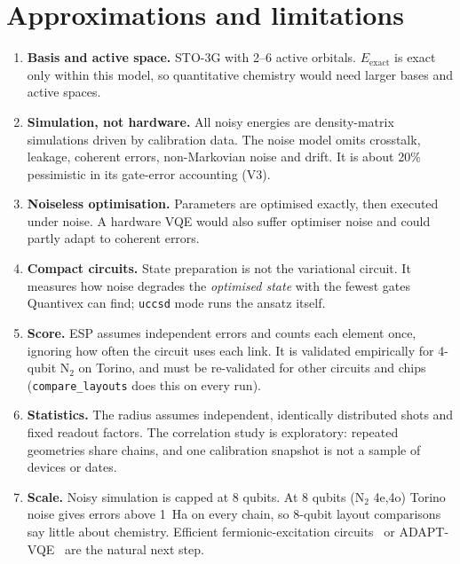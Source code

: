 \documentclass[10pt,a4paper]{article}
\newcommand{\code}[1]{\texttt{\small #1}}
\begin{document}
\section{Approximations and limitations}\label{sec:limits}
\begin{enumerate}
\item \textbf{Basis and active space.} STO-3G with 2--6 active orbitals. $E_{\mathrm{exact}}$ is exact only within this model, so quantitative chemistry would need larger bases and active spaces.
\item \textbf{Simulation, not hardware.} All noisy energies are density-matrix simulations driven by calibration data. The noise model omits crosstalk, leakage, coherent errors, non-Markovian noise and drift. It is about 20\% pessimistic in its gate-error accounting (V3).
\item \textbf{Noiseless optimisation.} Parameters are optimised exactly, then executed under noise. A hardware VQE would also suffer optimiser noise and could partly adapt to coherent errors.
\item \textbf{Compact circuits.} State preparation is not the variational circuit. It measures how noise degrades the \emph{optimised state} with the fewest gates Quantivex can find; \code{uccsd} mode runs the ansatz itself.
\item \textbf{Score.} ESP assumes independent errors and counts each element once, ignoring how often the circuit uses each link. It is validated empirically for 4-qubit N$_2$ on Torino, and must be re-validated for other circuits and chips (\code{compare\_layouts} does this on every run).
\item \textbf{Statistics.} The radius assumes independent, identically distributed shots and fixed readout factors. The correlation study is exploratory: repeated geometries share chains, and one calibration snapshot is not a sample of devices or dates.
\item \textbf{Scale.} Noisy simulation is capped at 8 qubits. At 8 qubits (N$_2$ 4e,4o) Torino noise gives errors above 1~Ha on every chain, so 8-qubit layout comparisons say little about chemistry. Efficient fermionic-excitation circuits~\cite{Yordanov2020} or ADAPT-VQE~\cite{Grimsley2019} are the natural next step.
\end{enumerate}
\end{document}
